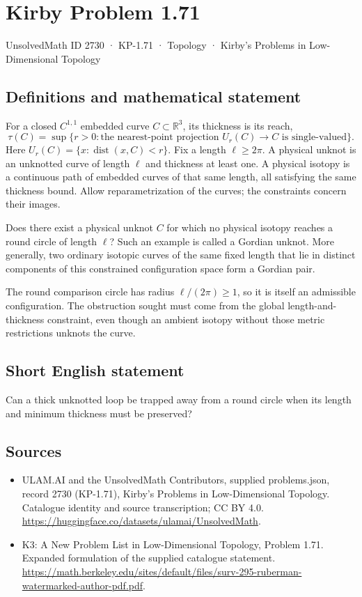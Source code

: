 \documentclass[11pt,a4paper]{article}
\begin{document}
\section*{Kirby Problem 1.71}\label{2730}
{\small UnsolvedMath ID 2730 · KP-1.71 · Topology · Kirby's Problems in Low-Dimensional Topology}
\subsection{Definitions and mathematical statement}
For a closed $C^{1,1}$ embedded curve $C\subset\mathbb R^3$, its thickness is
its reach,
\[
\tau(C)=\sup\{r>0:\text{the nearest-point projection }U_r(C)\to C
\text{ is single-valued}\}.
\]
Here $U_r(C)=\{x:\operatorname{dist}(x,C)<r\}$. Fix a length $\ell\geq2\pi$. A physical unknot is an unknotted curve of length
$\ell$ and thickness at least one. A physical isotopy is a continuous path of
embedded curves of that same length, all satisfying the same thickness bound.
Allow reparametrization of the curves; the constraints concern their images.

Does there exist a physical unknot $C$ for which no physical isotopy reaches a
round circle of length $\ell$? Such an example is called a Gordian unknot.
More generally, two ordinary isotopic curves of the same fixed length that lie
in distinct components of this constrained configuration space form a Gordian
pair.

The round comparison circle has radius $\ell/(2\pi)\geq1$, so it is itself an
admissible configuration. The obstruction sought must come from the global
length-and-thickness constraint, even though an ambient isotopy without those
metric restrictions unknots the curve.
\subsection{Short English statement}
Can a thick unknotted loop be trapped away from a round circle when its length and minimum thickness must be preserved?
\subsection{Sources}
\begin{itemize}
\item[S1] ULAM.AI and the UnsolvedMath Contributors, supplied problems.json, record 2730 (KP-1.71), Kirby's Problems in Low-Dimensional Topology. Catalogue identity and source transcription; CC BY 4.0.
\url{https://huggingface.co/datasets/ulamai/UnsolvedMath}.
\item[S2] K3: A New Problem List in Low-Dimensional Topology, Problem 1.71. Expanded formulation of the supplied catalogue statement.
\url{https://math.berkeley.edu/sites/default/files/surv-295-ruberman-watermarked-author-pdf.pdf}.
\end{itemize}
\end{document}
